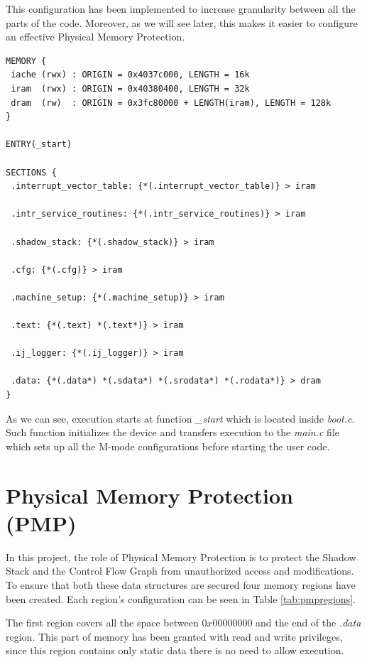 This configuration has been implemented to increase granularity between all the parts
of the code. Moreover, as we will see later, this makes it easier to configure
an effective Physical Memory Protection.

\begin{lstlisting}[style=CStyle, caption= Simplified linker script, label={lst:linker}]
MEMORY {
 iache (rwx) : ORIGIN = 0x4037c000, LENGTH = 16k
 iram  (rwx) : ORIGIN = 0x40380400, LENGTH = 32k
 dram  (rw)  : ORIGIN = 0x3fc80000 + LENGTH(iram), LENGTH = 128k
}

ENTRY(_start)

SECTIONS {
 .interrupt_vector_table: {*(.interrupt_vector_table)} > iram

 .intr_service_routines: {*(.intr_service_routines)} > iram

 .shadow_stack: {*(.shadow_stack)} > iram

 .cfg: {*(.cfg)} > iram

 .machine_setup: {*(.machine_setup)} > iram

 .text: {*(.text) *(.text*)} > iram

 .ij_logger: {*(.ij_logger)} > iram

 .data: {*(.data*) *(.sdata*) *(.srodata*) *(.rodata*)} > dram
}
\end{lstlisting}

As we can see, execution starts at function \textit{\_start} which is located inside
\textit{boot.c}. Such function initializes the device and transfers execution to
the \textit{main.c} file which sets up all the M-mode configurations before
starting the user code.

\section{Physical Memory Protection (PMP)}
\label{sec:project_pmp}

In this project, the role of Physical Memory Protection is to protect the Shadow
Stack and the Control Flow Graph from unauthorized access and modifications. To ensure
that both these data structures are secured four memory regions have been created.
Each region's configuration can be seen in Table \ref{tab:pmpregions}.

The first region covers all the space between $0x00000000$ and the end of the
\textit{.data} region. This part of memory has been granted with read and write
privileges, since this region contains only static data there is no need to allow
execution.

